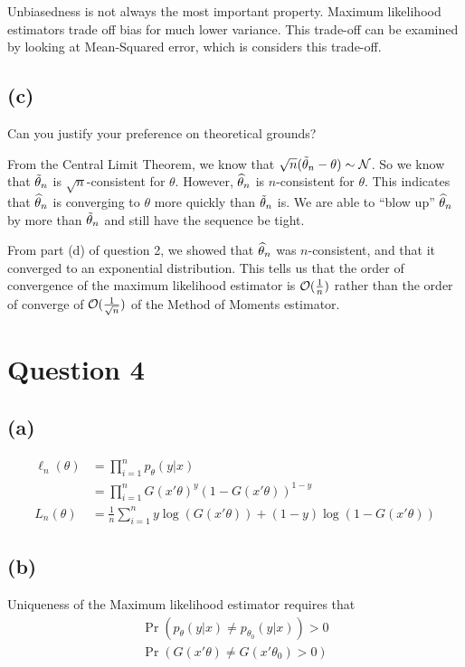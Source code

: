 \documentclass[12pt]{paper}
\begin{document}
Unbiasedness is not always the most important property. Maximum
likelihood estimators trade off bias for much lower variance. This
trade-off can be examined by looking at Mean-Squared error, which is
considers this trade-off.

\subsection{(c)}

Can you justify your preference on theoretical grounds?

From the Central Limit Theorem, we know that $\sqrt{n} ( \tilde{ \theta }_{n} -
\theta) \sim \mathcal{N}$. So we know that $\tilde{ \theta }_{n}$ is $\sqrt{n}$-consistent
for $\theta$. However, $\widehat{ \theta }_{n}$ is $n$-consistent for $\theta$. This indicates
that $\widehat{ \theta }_{n}$ is converging to $\theta$ more quickly than $\tilde{ \theta }_{n}$
is. We are able to ``blow up'' $\widehat{ \theta }_{n}$ by more than $\tilde{ \theta }_{n}$ and
still have the sequence be tight.

From part (d) of question 2, we showed that $\widehat{ \theta }_{n}$ was
$n$-consistent, and that it converged to an exponential
distribution. This tells us that the order of convergence of the
maximum likelihood estimator is $\mathcal{O}( \frac{1}{n})$ rather than the
order of converge of $\mathcal{O} ( \frac{1}{\sqrt{n}})$ of the Method of
Moments estimator.

\section{Question 4}

\subsection{(a)}


\begin{align*}
  \ell_n(\theta) &= \prod_{i=1}^n p_{\theta}(y \vert x)\\
         &= \prod_{i=1}^n G(x'\theta)^y ( 1 - G(x'\theta))^{1-y}\\
  L_n(\theta) &= \frac{1}{n} \sum_{i=1}^n y \log( G(x'\theta) ) + (1-y) \log( 1 - G(x'\theta))
\end{align*}

\subsection{(b)}
Uniqueness of the Maximum likelihood estimator requires that
\begin{align*}
  \Pr( p_{\theta}( y \vert x) \neq p_{\theta_0}(y \vert x)) > 0\\
  \Pr( G( x'\theta) \neq G( x' \theta_0) > 0)\\
\end{align*}
\end{document}

